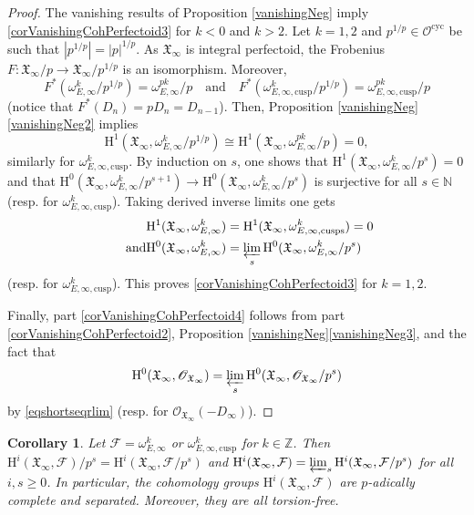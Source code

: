 \documentclass[11pt]{article}
\newcommand{\resp}{resp.\xspace}
\newcommand{\quand}{\quad\text{and}\quad}
\newcommand{\cusp}{\mathrm{cusp}}
\newcommand{\cusps}{\mathrm{cusps}}
\newcommand{\cyc}{\mathrm{cyc}}
\numberwithin{equation}{section}
\newtheorem{cor}[prop]{Corollary}
\theoremstyle{definition}
\newcommand{\bb}[1]{\mathbb{#1}}
\newcommand{\n}[1]{\mathcal{#1}}
\newcommand{\f}[1]{\mathfrak{#1}}
\newcommand{\s}[1]{\mathscr{#1}}
\begin{document}
\begin{proof}
The vanishing results of Proposition \ref{vanishingNeg} imply \eqref{corVanishingCohPerfectoid3} for $k<0$ and $k>2$. Let $k=1,2$ and $p^{1/p}\in \n{O}^{\cyc}$ be such that $|p^{1/p}|=|p|^{1/p}$. As $\f{X}_{\infty}$ is integral perfectoid, the Frobenius $F:\f{X}_{\infty}/p\to \f{X}_{\infty}/p^{1/p}$ is an isomorphism. Moreover,
\[
F^*(\omega_{E,\infty}^{k}/p^{1/p})=\omega_{E,\infty}^{pk}/p\quand F^*(\omega_{E,\infty,\cusp}^k/p^{1/p})=\omega_{E,\infty,\cusp}^{pk}/p
\]
(notice that $F^*(D_n)=pD_n= D_{n-1}$). Then, Proposition \ref{vanishingNeg}\eqref{vanishingNeg2} implies
\begin{equation}
\label{vanishingperfint}
\mathrm{H}^1(\f{X}_{\infty}, \omega^k_{E,\infty}/p^{1/p})\cong \mathrm{H}^1(\f{X}_{\infty}, \omega^{pk}_{E,\infty}/p)=0,
\end{equation}
similarly for $\omega^{k}_{E,\infty,\cusp}$. By induction on $s$, one shows that $\mathrm{H}^1(\f{X}_{\infty}, \omega_{E,\infty}^k/p^s)=0$ and that $\mathrm{H}^0(\f{X}_{\infty}, \omega^k_{E,\infty}/p^{s+1})\to \mathrm{H}^0(\f{X}_{\infty}, \omega^k_{E,\infty}/p^s)$ is surjective for all $s\in \bb{N}$ (\resp for $\omega_{E,\infty,\cusp}^{k}$). Taking derived inverse limits one gets
\begin{align*}
\mathrm{H}^1(\f{X}_{\infty}, \omega_{E,\infty}^k)&=\mathrm{H}^1(\f{X}_{\infty}, \omega_{E,\infty,\cusps}^k)=0\\
\tag*{and}
\mathrm{H}^0(\f{X}_{\infty}, \omega^k_{E,\infty})&= \varprojlim_s \mathrm{H}^0(\f{X}_{\infty}, \omega^k_{E,\infty}/p^s)
\end{align*}
(\resp for $\omega^k_{E,\infty, \cusp}$). This proves \eqref{corVanishingCohPerfectoid3} for $k=1,2$.

Finally, part \eqref{corVanishingCohPerfectoid4} follows from part \eqref{corVanishingCohPerfectoid2}, Proposition \ref{vanishingNeg}\eqref{vanishingNeg3}, and the fact that
\[\mathrm{H}^0(\f{X}_{\infty}, \s{O}_{\f{X}_\infty})= \varprojlim_s \mathrm{H}^0(\f{X}_{\infty}, \s{O}_{\f{X}_\infty}/p^s)\]
by \eqref{eqshortseqrlim} (\resp for $\s{O}_{\f{X}_{\infty}}(-D_{\infty})$).
\end{proof}

\begin{cor}
\label{CoroHiTorsionfree}
Let $\n{F}=\omega^k_{E,\infty}$ or $\omega^k_{E,\infty,\cusp}$ for $k\in \bb{Z}$. Then $\mathrm{H}^i(\f{X}_{\infty}, \n{F})/p^s= \mathrm{H}^i(\f{X}_{\infty}, \n{F}/p^s)$ and $ \mathrm{H}^i(\f{X}_{\infty}, \n{F})=\varprojlim_s \mathrm{H}^i(\f{X}_{\infty}, \n{F} /p^s)$ for all $i,s\geq 0$. In particular, the cohomology groups $ \mathrm{H}^i(\f{X}_{\infty}, \n{F})$ are $p$-adically complete and separated. Moreover, they are all torsion-free.
\end{cor}
\end{document}
